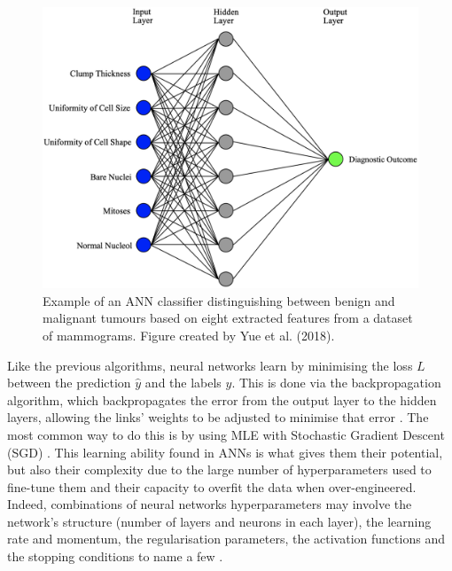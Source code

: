 \begin{figure}[ht]
\centerline{\includegraphics[width=\textwidth]{Dissertation/figures/litsurvey/ann.png}}
\caption{\label{fig:litsurvey-ann-example}Example of an ANN classifier distinguishing between benign and malignant tumours based on eight extracted features from a dataset of mammograms. Figure created by Yue et al. (2018).}
\end{figure}

Like the previous algorithms, neural networks learn by minimising the loss $L$ between the prediction $\hat{y}$ and the labels $y$. This is done via the backpropagation algorithm, which backpropagates the error from the output layer to the hidden layers, allowing the links' weights to be adjusted to minimise that error \cite{russell2002artificial}. The most common way to do this is by using MLE with Stochastic Gradient Descent (SGD) \cite{Litjens2017}. This learning ability found in ANNs is what gives them their potential, but also their complexity due to the large number of hyperparameters used to fine-tune them and their capacity to overfit the data when over-engineered. Indeed, combinations of neural networks hyperparameters may involve the network's structure (number of layers and neurons in each layer), the learning rate and momentum, the regularisation parameters, the activation functions and the stopping conditions to name a few \cite{sklearn-MLP-2019}.\\

